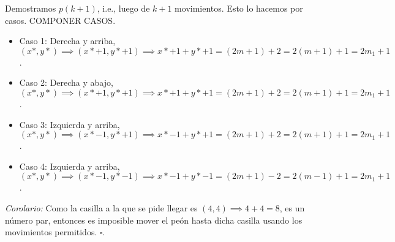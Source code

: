 Demostramos $p(k+1)$, i.e., luego de $k+1$ movimientos. Esto lo hacemos por casos. 
COMPONER CASOS.
\begin{itemize}
    \item Caso 1: Derecha y arriba, $(x*,y*)\implies (x*+1,y*+1) \implies x*+1+y*+1 = (2m+1)+2 = 2(m+1)+1 = 2m_1+1$.
    \item Caso 2: Derecha y abajo,  $(x*,y*)\implies (x*+1,y*+1) \implies x*+1+y*+1 = (2m+1)+2 = 2(m+1)+1 = 2m_1+1$.
    \item Caso 3: Izquierda y arriba,  $(x*,y*)\implies (x*-1,y*+1) \implies x*-1+y*+1 = (2m+1)+2 = 2(m+1)+1 = 2m_1+1$.
    \item Caso 4: Izquierda y arriba,  $(x*,y*)\implies (x*-1,y*-1) \implies x*-1+y*-1 = (2m+1)-2 = 2(m-1)+1 = 2m_1+1$.
\end{itemize}

\emph{Corolario:} Como la casilla a la que se pide llegar es $(4,4) \implies 4+4=8$, es un número par, entonces es imposible mover el peón hasta dicha casilla usando los movimientos permitidos. $\square$.

